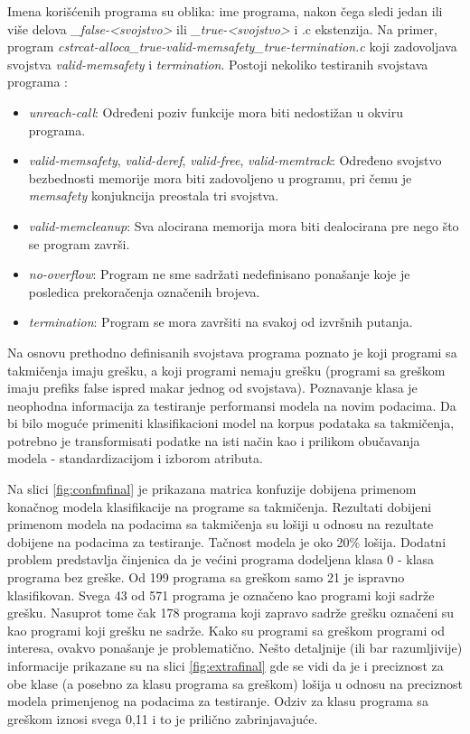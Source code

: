 \documentclass[12pt,oneside]{memoir}
\begin{document}
Imena korišćenih programa su oblika: ime programa, nakon čega sledi jedan ili više delova \textit{\_false-<svojstvo>} ili \textit{\_true-<svojstvo>} i .c ekstenzija. Na primer, program \textit{cstrcat-alloca\_true-valid-memsafety\_true-termination.c} koji zadovoljava svojstva \textit{valid-memsafety} i \textit{termination}. Postoji nekoliko testiranih svojstava programa \cite{benchmarks}:
\begin{itemize}
	\item \textit{unreach-call}: Određeni poziv funkcije mora biti nedostižan u okviru programa.
	\item \textit{valid-memsafety}, \textit{valid-deref}, \textit{valid-free}, \textit{valid-memtrack}: Određeno svojstvo bezbednosti memorije mora biti zadovoljeno u programu, pri čemu je \textit{memsafety} konjukncija preostala tri svojstva.
	\item \textit{valid-memcleanup}: Sva alocirana memorija mora biti dealocirana pre nego što se program završi.
	\item \textit{no-overflow}: Program ne sme sadržati nedefinisano ponašanje koje je posledica prekoračenja označenih brojeva.
	\item \textit{termination}: Program se mora završiti na svakoj od izvršnih putanja.
\end{itemize}

Na osnovu prethodno definisanih svojstava programa poznato je koji programi sa takmičenja imaju grešku, a koji programi nemaju grešku (programi sa greškom imaju prefiks false ispred makar jednog od svojstava). Poznavanje klasa je neophodna informacija za testiranje performansi modela na novim podacima. Da bi bilo moguće primeniti klasifikacioni model na korpus podataka sa takmičenja, potrebno je transformisati podatke na isti način kao i prilikom obučavanja modela - standardizacijom i izborom atributa. 

Na slici \ref{fig:confmfinal} je prikazana matrica konfuzije dobijena primenom konačnog modela klasifikacije na programe sa takmičenja. Rezultati dobijeni primenom modela na podacima sa takmičenja su lošiji u odnosu na rezultate dobijene na podacima za testiranje. Tačnost modela je oko 20\% lošija. Dodatni problem predstavlja činjenica da je većini programa dodeljena klasa 0 - klasa programa bez greške. Od 199 programa sa greškom samo 21 je ispravno klasifikovan. Svega 43 od 571 programa je označeno kao programi koji sadrže grešku. Nasuprot tome čak 178 programa koji zapravo sadrže grešku označeni su kao programi koji grešku ne sadrže. Kako su programi sa greškom programi od interesa, ovakvo ponašanje je problematično. Nešto detaljnije (ili bar razumljivije) informacije prikazane su na slici \ref{fig:extrafinal} gde se vidi da je i preciznost za obe klase (a posebno za klasu programa sa greškom) lošija u odnosu na preciznost modela primenjenog na podacima za testiranje. Odziv za klasu programa sa greškom iznosi svega 0,11 i to je prilično zabrinjavajuće.
\end{document}
